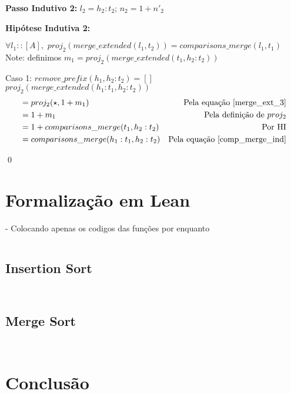 \documentclass[12pt, oneside, a4paper,english,brazil]{abntex2}
\begin{document}
\textbf{Passo Indutivo 2: } $l_{2} = h_{2} : t_{2}$; $n_{2} = 1 + n'_{2}$

\textbf{Hip\'otese Indutiva 2: }

\qquad $\forall l_{1} :: [A], \,\, proj_{2}(merge\_extended(l_{1}, t_{2})) = comparisons\_merge(l_{1}, t_{1})$ \\

Note: definimos $m_{1} = proj_{2}(merge\_extended(t_{1}, h_{2} : t_{2}))$

Caso 1: $remove\_prefix(h_{1}, h_{2} : t_{2}) = []$\\

$proj_{2}(merge\_extended(h_{1} : t_{1}, h_{2} : t_{2}))$
\begin{align*}
   &= proj_{2}(\star, 1 + m_{1}) &\text{Pela equa\c{c}\~ao \ref{merge_ext_3}}\\
  &= 1 + m_{1} &\text{Pela defini\c{c}\~ao de $proj_{2}$} \\
   &= 1 + comparisons\_merge(t_{1}, h_{2} : t_{2}) &\text{Por HI} \\
  &= comparisons\_merge(h_{1} : t_{1}, h_{2} : t_{2}) &\text{Pela equa\c{c}\~ao \ref{comp_merge_ind}}
\end{align*}

\qed


\chapter{Formaliza\c{c}\~ao em Lean}
- Colocando apenas os codigos das fun\c{c}\~oes por enquanto

\inputminted{lean}{declarations.lean}
\section{Insertion Sort}
\inputminted{lean}{insertion_sort.lean}
\inputminted{lean}{insertion_sort_modified.lean}

\section{Merge Sort}

\inputminted{lean}{merge_sort.lean}
\inputminted{lean}{merge_sort_modified.lean}

\chapter{Conclus\~ao}

\postextual


% 

\end{document}
